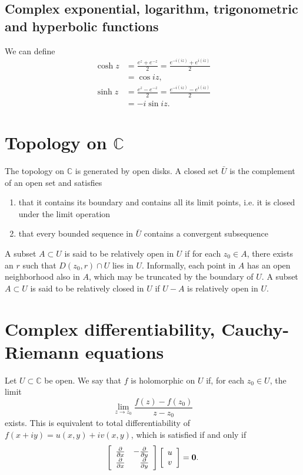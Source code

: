 \documentclass{article}
\begin{document}
\subsection{Complex exponential, logarithm,
                  trigonometric and hyperbolic functions}

We can define
\begin{align*}
   \cosh z
&= \frac{e^z + e^{-z}}{2}
 = \frac{e^{-i(iz)} + e^{i(iz)}}{2} \\
&= \cos iz, \\
   \sinh z
&= \frac{e^z - e^{-z}}{2}
 = \frac{e^{-i(iz)} - e^{i(iz)}}{2} \\
&= -i \sin iz.
\end{align*}

\section{Topology on $\mathbb{C}$}

The topology on $\mathbb{C}$ is generated by open disks.
A closed set $\bar{U}$ is the complement of an open set
and satisfies
\begin{enumerate}
  \item{
    that it contains its boundary and contains all its
    limit points, i.e. it is closed under the limit operation
  }
  \item{
    that every bounded sequence in $\bar{U}$ contains a
    convergent subsequence
  }
\end{enumerate}

A subset $A \subset U$ is said to be relatively open in $U$ if
for each $z_0 \in A$, there exists an $r$ such that
$D(z_0, r) \cap U$ lies in $U$. Informally, each point in $A$ has an
open neighborhood also in $A$, which may be truncated by the boundary
of $U$.
A subset $A \subset U$ is said to be relatively closed in $U$
if $U - A$ is relatively open in $U$.

\section{Complex differentiability, Cauchy-Riemann equations}

Let $U \subset \mathbb{C}$ be open. We say that $f$ is
holomorphic on $U$ if, for each $z_0 \in U$, the limit
$$
  \lim_{z \to z_0}
    \frac{f(z) - f(z_0)}
         {z - z_0}
$$
exists. This is equivalent to total differentiability of
$f(x + i y) = u(x, y) + i v(x, y)$, which is satisfied if and
only if
$$
  \left[
    \begin{array}{r r}
       \frac{\partial}{\partial x}
    & -\frac{\partial}{\partial y} \\
       \frac{\partial}{\partial x}
    &  \frac{\partial}{\partial y}
    \end{array}
  \right]
  \left[
    \begin{array}{c}
      u \\
      v
    \end{array}
  \right]
= \mathbf{0}.
$$
\end{document}
